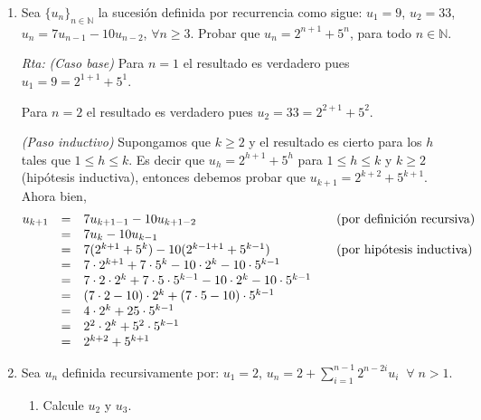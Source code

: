 \documentclass[a4paper,12pt,twoside,spanish,reqno]{amsbook}
\numberwithin{equation}{section}
\newcommand{\rta}{\noindent\textit{Rta: }}
\begin{document}
\begin{enumerate}
        
        \item Sea $\{ u_n \}_{n \in \mathbb N}$ la sucesión definida por recurrencia como sigue: $u_1 = 9$, $u_2 = 33$, $u_n = 7u_{n-1} - 10u_{n-2}$, $\forall n \geq 3$. Probar que $u_n = 2^{n+1} + 5^n$, para todo $n \in \mathbb N$.
        
        
        \rta         
        \textit{(Caso  base) } Para $n=1$ el resultado es verdadero pues $u_1 = 9 = 2^{1+1} + 5^1$.
        
        Para $n=2$ el resultado es verdadero pues $u_2 = 33 = 2^{2+1} + 5^2$.
        
        {\it (Paso  inductivo) } Supongamos que $k \ge 2$ y el resultado  es cierto para los $h$ tales que  $1 \le h \le k$. Es decir que $u_h = 2^{h+1} + 5^h$ para $1 \le h \le k$ y $k \ge 2$ (hipótesis inductiva), entonces debemos probar que $u_{k+1} = 2^{k+2}+5^{k+1}$. Ahora bien, 
        \begin{equation*}
        \begin{matrix}
        u_{k+1} &=& 7u_{k+1-1} - 10u_{k+1-2}  \hfill &\quad \text{(por definición recursiva)} \hfill \\
        &=& 7u_{k} - 10u_{k-1}  \hfill &\hfill\\
        &=& 7( 2^{k+1} + 5^k) -10 ( 2^{k-1+1} + 5^{k-1})  \hfill &\quad \text{(por hipótesis inductiva})\hfill \\
        &=& 7 \cdot  2^{k+1} + 7 \cdot 5^k -10 \cdot  2^{k} -10 \cdot  5^{k-1} \hfill  & \hfill\\
        &=& 7 \cdot 2 \cdot  2^{k} + 7 \cdot 5 \cdot 5^{k-1} -10 \cdot  2^{k} -10 \cdot  5^{k-1}  \hfill  & \hfill\\
        &=& (7 \cdot 2 -10 ) \cdot  2^{k} + (7 \cdot 5 -10) \cdot 5^{k-1}  \hfill  & \hfill\\
        &=& 4 \cdot  2^{k} + 25 \cdot 5^{k-1}  \hfill  & \hfill\\
        &=& 2^2 \cdot  2^{k} + 5^2 \cdot 5^{k-1}  \hfill  & \hfill\\
        &=& 2^{k+2} + 5^{k+1}  \hfill  & \hfill
        \end{matrix}
        \end{equation*}

        
        \item Sea $u_n$ definida recursivamente por: $u_1=2$, $u_n=2+\sum_{i=1}^{n-1}2^{n-2i}u_i \;\;\forall\; n >1$.
        \begin{enumerate}
            \item Calcule $u_2$ y $u_3$.
            

\end{enumerate}
\end{enumerate}
\end{document}
